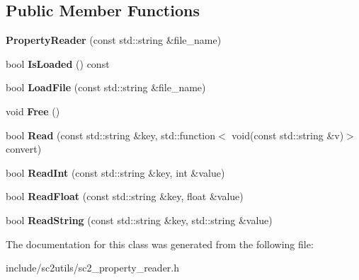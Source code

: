 \subsection*{Public Member Functions}
\begin{DoxyCompactItemize}
\item 
\mbox{\label{classsc2_1_1_property_reader_ac7d87a12408c79c3c5474461811a19b5}} 
{\bfseries Property\+Reader} (const std\+::string \&file\+\_\+name)
\item 
\mbox{\label{classsc2_1_1_property_reader_a2c436f5309efb9fff160988558c2196f}} 
bool {\bfseries Is\+Loaded} () const
\item 
\mbox{\label{classsc2_1_1_property_reader_ac41f39e7288dc81504f3957c31ab6cdd}} 
bool {\bfseries Load\+File} (const std\+::string \&file\+\_\+name)
\item 
\mbox{\label{classsc2_1_1_property_reader_ac8b4b1b57085f4625e506fb3f69d5983}} 
void {\bfseries Free} ()
\item 
\mbox{\label{classsc2_1_1_property_reader_adf6303ea57e5fedf982ff71541164e79}} 
bool {\bfseries Read} (const std\+::string \&key, std\+::function$<$ void(const std\+::string \&v)$>$ convert)
\item 
\mbox{\label{classsc2_1_1_property_reader_ab046f877ea5d9667ad2a55c23ca67ce9}} 
bool {\bfseries Read\+Int} (const std\+::string \&key, int \&value)
\item 
\mbox{\label{classsc2_1_1_property_reader_a8319f9c74de8f016ca48edd50470d148}} 
bool {\bfseries Read\+Float} (const std\+::string \&key, float \&value)
\item 
\mbox{\label{classsc2_1_1_property_reader_af056bbbee4b1427d8f5c07371ccf71d6}} 
bool {\bfseries Read\+String} (const std\+::string \&key, std\+::string \&value)
\end{DoxyCompactItemize}


The documentation for this class was generated from the following file\+:\begin{DoxyCompactItemize}
\item 
include/sc2utils/sc2\+\_\+property\+\_\+reader.\+h\end{DoxyCompactItemize}
